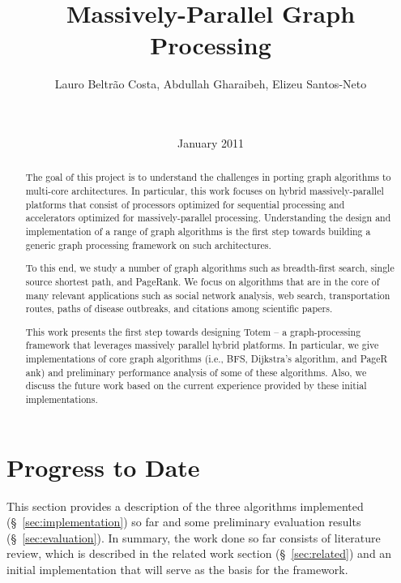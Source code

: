 \documentclass{acm_proc_article-sp}[12pt]
\title{Massively-Parallel Graph Processing}
\author{
\alignauthor 
Lauro Beltr\~ao Costa, Abdullah Gharaibeh, Elizeu
Santos-Neto\vspace{3mm}\\
       \affaddr{\small{University of British Columbia}}\\
       \affaddr{\small{2332 Main Mall, Vancouver, BC, CANADA}}\\
       \email{\small{\{lauroc,abdullah,elizeus\}@ece.ubc.ca}}
}
\date{ January 2011}
\newcommand{\comment}[2]{\begin{center}\colorbox{#1}{\parbox{0.85\linewidth}{\textit{{#2}}}}\end{center}}
\newcommand{\abdullah}[1]{\comment{midblue}{{Abdullah: #1}}}
\newcommand{\lauro}[1]{\comment{orange}{{Lauro: #1}}}
\newcommand{\elizeu}[1]{\comment{lightgreen}{{Elizeu: #1}}}
\begin{document}
\maketitle


\begin{abstract}
The goal of this project is to understand the challenges in porting graph algorithms to multi-core architectures. In particular, this work focuses on hybrid massively-parallel platforms that consist of processors optimized for sequential processing and accelerators optimized for massively-parallel processing. Understanding the design and implementation of a range of graph algorithms is the first step towards building a generic graph processing framework on such architectures.

To this end, we study a number of graph algorithms such as breadth-first search, single source shortest path, and PageRank. We focus on algorithms that are in the core of many relevant applications such as social network analysis, web search, transportation routes, paths of disease outbreaks, and citations among scientific papers.

This work presents the first step towards designing {\sc Totem} -- a graph-processing framework that leverages massively parallel hybrid platforms. In particular, we give implementations of core graph algorithms (i.e., BFS, Dijkstra's algorithm, and PageR ank) and preliminary performance analysis of some of these algorithms. Also, we discuss the future work based on the current experience provided by these initial implementations.


\end{abstract}







\section{Progress to Date}
\label{sec:progress}

This section provides a description of the three algorithms implemented (\S~\ref{sec:implementation}) so far and some preliminary evaluation results (\S~\ref{sec:evaluation}). In summary, the work done so far consists of literature review, which is described in the related work section (\S~\ref{sec:related}) and an initial implementation that will serve as the basis for the framework.


%






\end{document}
